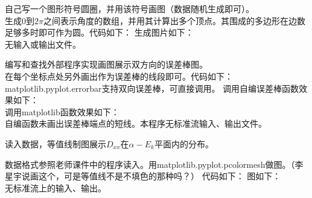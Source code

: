 \documentclass{ctexart}
\begin{document}
    \maketitle

    \begin{answer}

        自己写一个图形符号圆圈，并用该符号画图（数据随机生成即可）。\\

        生成0到$2\pi$之间表示角度的数组，并用其计算出多个顶点。其围成的多边形在边数足够多时即可作为圆。代码如下：
        生成图片如下：
        \\
        无输入或输出文件。

        编写和查找外部程序实现画图展示双方向的误差棒图。\\

        在每个坐标点处另外画出作为误差棒的线段即可。代码如下：
        matplotlib.pyplot.errorbar支持双向误差棒，可直接调用。
        调用自编误差棒函数效果如下：
        \\
        调用matplotlib函数效果如下：
        \\
        自编函数未画出误差棒端点的短线。本程序无标准流输入、输出文件。

        读入数据，等值线制图展示$D_{xx}$在$\alpha-E_k$平面内的分布。

        数据格式参照老师课件中的程序读入。用matplotlib.pyplot.pcolormesh做图。（李星宇说画这个，可是等值线不是不填色的那种吗？）
        代码如下：
        图如下：
        \\
        无标准流上的输入、输出。

    \end{answer}
\end{document}

